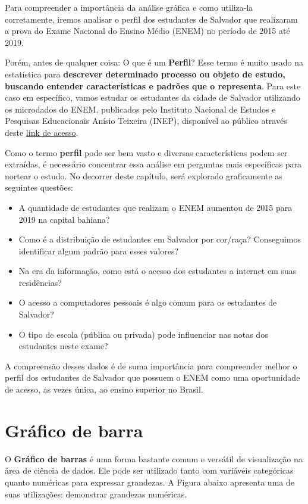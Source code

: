 \documentclass[
]{book}
\begin{document}
Para compreender a importância da análise gráfica e como utiliza-la corretamente, iremos analisar o perfil dos estudantes de Salvador que realizaram a prova do Exame Nacional do Ensino Médio (ENEM) no período de 2015 até 2019.

Porém, antes de qualquer coisa: O que é um \textbf{Perfil}? Esse termo é muito usado na estatística para \textbf{descrever determinado processo ou objeto de estudo, buscando entender características e padrões que o representa}. Para este caso em específico, vamos estudar os estudantes da cidade de Salvador utilizando os microdados do ENEM, publicados pelo Instituto Nacional de Estudos e Pesquisas Educacionais Anísio Teixeira (INEP), disponível ao público através deste \href{http://inep.gov.br/microdados}{link de acesso}.

Como o termo \textbf{perfil} pode ser bem vasto e diversas características podem ser extraídas, é necessário concentrar essa análise em perguntas mais específicas para nortear o estudo. No decorrer deste capítulo, será explorado graficamente as seguintes questões:

\begin{itemize}
\item
  A quantidade de estudantes que realizam o ENEM aumentou de 2015 para 2019 na capital bahiana?
\item
  Como é a distribuição de estudantes em Salvador por cor/raça? Conseguimos identificar algum padrão para esses valores?
\item
  Na era da informação, como está o acesso dos estudantes a internet em suas residências?
\item
  O acesso a computadores pessoais é algo comum para os estudantes de Salvador?
\item
  O tipo de escola (pública ou privada) pode influenciar nas notas dos estudantes neste exame?
\end{itemize}

A compreensão desses dados é de suma importância para compreender melhor o perfil dos estudantes de Salvador que possuem o ENEM como uma oportunidade de acesso, as vezes única, ao ensino superior no Brasil.

\hypertarget{gruxe1fico-de-barra}{%
\section{Gráfico de barra}\label{gruxe1fico-de-barra}}

O \textbf{Gráfico de barras} é uma forma bastante comum e versátil de visualização na área de ciência de dados. Ele pode ser utilizado tanto com variáveis categóricas quanto numéricas para expressar grandezas. A Figura abaixo apresenta uma de suas utilizações: demonstrar grandezas numéricas.
\end{document}
